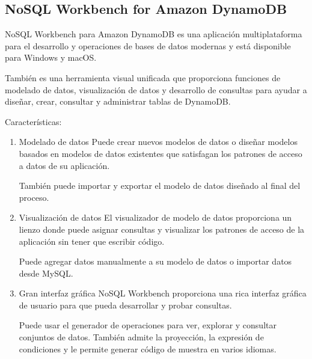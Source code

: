 \subsection{NoSQL Workbench for Amazon DynamoDB}


NoSQL Workbench para Amazon DynamoDB es una aplicación multiplataforma para el desarrollo y operaciones de bases de datos modernas y está disponible para Windows y macOS.


También es una herramienta visual unificada que proporciona funciones de modelado de datos, visualización de datos y desarrollo de consultas para ayudar a diseñar, crear, consultar y administrar tablas de DynamoDB.


Características: 

\begin{enumerate}
	\item Modelado de datos
	Puede crear nuevos modelos de datos o diseñar modelos basados en modelos de datos existentes que satisfagan los patrones de acceso a datos de su aplicación. 
	
	
	También puede importar y exportar el modelo de datos diseñado al final del proceso.
	\item Visualización de datos
	El visualizador de modelo de datos proporciona un lienzo donde puede asignar consultas y visualizar los patrones de acceso de la aplicación sin tener que escribir código. 
	
	
	Puede agregar datos manualmente a su modelo de datos o importar datos desde MySQL. 
	\item Gran interfaz gráfica
	NoSQL Workbench proporciona una rica interfaz gráfica de usuario para que pueda desarrollar y probar consultas. 
	
	
	Puede usar el generador de operaciones para ver, explorar y consultar conjuntos de datos. También admite la proyección, la expresión de condiciones y le permite generar código de muestra en varios idiomas.
	
\end{enumerate}


